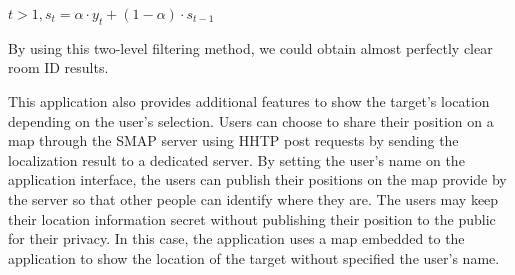 $t>1, s_t=\alpha \cdot y_t+(1-\alpha)\cdot s_{t-1}$

By using this two-level filtering method, we could obtain almost perfectly clear room ID results.

This application also provides additional features to show the target’s location depending on the user’s selection. Users can choose to share their position on a map through the SMAP server using HHTP post requests by sending the localization result to a dedicated server. By setting the user’s name on the application interface, the users can publish their positions on the map provide by the server so that other people can identify where they are. The users may keep their location information secret without publishing their position to the public for their privacy. In this case, the application uses a map embedded to the application to show the location of the target without specified the user’s name. 



